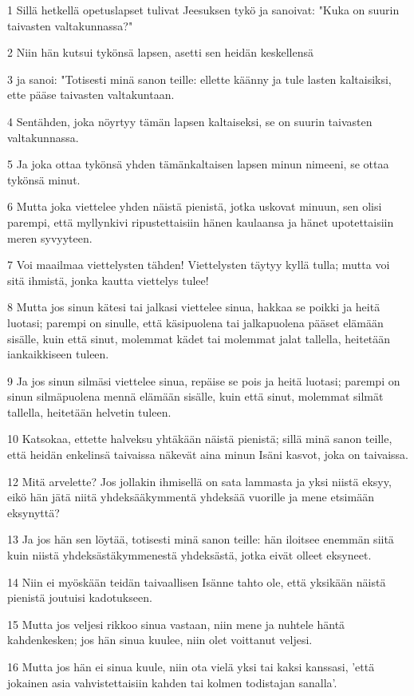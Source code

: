 \par 1 Sillä hetkellä opetuslapset tulivat Jeesuksen tykö ja sanoivat: "Kuka on suurin taivasten valtakunnassa?"
\par 2 Niin hän kutsui tykönsä lapsen, asetti sen heidän keskellensä
\par 3 ja sanoi: "Totisesti minä sanon teille: ellette käänny ja tule lasten kaltaisiksi, ette pääse taivasten valtakuntaan.
\par 4 Sentähden, joka nöyrtyy tämän lapsen kaltaiseksi, se on suurin taivasten valtakunnassa.
\par 5 Ja joka ottaa tykönsä yhden tämänkaltaisen lapsen minun nimeeni, se ottaa tykönsä minut.
\par 6 Mutta joka viettelee yhden näistä pienistä, jotka uskovat minuun, sen olisi parempi, että myllynkivi ripustettaisiin hänen kaulaansa ja hänet upotettaisiin meren syvyyteen.
\par 7 Voi maailmaa viettelysten tähden! Viettelysten täytyy kyllä tulla; mutta voi sitä ihmistä, jonka kautta viettelys tulee!
\par 8 Mutta jos sinun kätesi tai jalkasi viettelee sinua, hakkaa se poikki ja heitä luotasi; parempi on sinulle, että käsipuolena tai jalkapuolena pääset elämään sisälle, kuin että sinut, molemmat kädet tai molemmat jalat tallella, heitetään iankaikkiseen tuleen.
\par 9 Ja jos sinun silmäsi viettelee sinua, repäise se pois ja heitä luotasi; parempi on sinun silmäpuolena mennä elämään sisälle, kuin että sinut, molemmat silmät tallella, heitetään helvetin tuleen.
\par 10 Katsokaa, ettette halveksu yhtäkään näistä pienistä; sillä minä sanon teille, että heidän enkelinsä taivaissa näkevät aina minun Isäni kasvot, joka on taivaissa.
\par 12 Mitä arvelette? Jos jollakin ihmisellä on sata lammasta ja yksi niistä eksyy, eikö hän jätä niitä yhdeksääkymmentä yhdeksää vuorille ja mene etsimään eksynyttä?
\par 13 Ja jos hän sen löytää, totisesti minä sanon teille: hän iloitsee enemmän siitä kuin niistä yhdeksästäkymmenestä yhdeksästä, jotka eivät olleet eksyneet.
\par 14 Niin ei myöskään teidän taivaallisen Isänne tahto ole, että yksikään näistä pienistä joutuisi kadotukseen.
\par 15 Mutta jos veljesi rikkoo sinua vastaan, niin mene ja nuhtele häntä kahdenkesken; jos hän sinua kuulee, niin olet voittanut veljesi.
\par 16 Mutta jos hän ei sinua kuule, niin ota vielä yksi tai kaksi kanssasi, 'että jokainen asia vahvistettaisiin kahden tai kolmen todistajan sanalla'.
